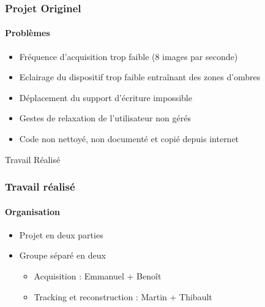 \documentclass[12pt]{beamer}
\begin{document}
\begin{frame}
\frametitle{Projet Originel}
\framesubtitle{Problèmes}
\begin{itemize}
\item Fréquence d'acquisition trop faible (8 images par seconde)
\item Eclairage du dispositif trop faible entraînant des zones d'ombres
\item Déplacement du support d'écriture impossible
\item Gestes de relaxation de l'utilisateur non gérés
\item Code non nettoyé, non documenté et copié depuis internet
\end{itemize}
\end{frame}

\begin{frame}
\Huge{\centerline{Travail Réalisé}}
\end{frame}

\begin{frame}
\frametitle{Travail réalisé}
\framesubtitle{Organisation}
\begin{itemize}
\item Projet en deux parties
\item Groupe séparé en deux
	\begin{itemize}
	\item Acquisition : Emmanuel + Benoît
	\item Tracking et reconstruction : Martin + Thibault
	\end{itemize}
\end{itemize}
\end{frame}
\end{document}
